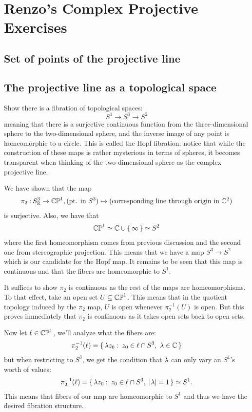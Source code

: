 \documentclass[12pt]{memoir}
\begin{document}
\chapter{Renzo's Complex Projective Exercises}

\section{Set of points of the projective line}

\section{The projective line as a topological space}

\begin{Ej}
    Show there is a fibration of topological spaces:
    $$S^1\to S^3\to S^2$$
    meaning that there is a surjective continuous function from the three-dimensional sphere to the two-dimensional sphere, and the inverse image of any point is homeomorphic to a circle. This is called the Hopf fibration; notice that while the construction of these maps is rather mysterious in terms of spheres, it becomes transparent when thinking of the two-dimensional sphere as the complex projective line.
\end{Ej}
\begin{ptcbr}
We have shown that the map 
$$\pi_2\mathbin{:} S^3_{\mathbb{R}}\to\mathbb{CP}^1,(\text{pt. in }S^3)\mapsto(\text{corresponding line through origin in }\mathbb{C}^2)$$
is surjective. Also, we have that 
$$\mathbb{CP}^1\simeq \mathbb{C}\cup\{\,\infty\,\}\simeq S^2$$
where the first homeomorphism comes from previous discussion and the second one from stereographic projection. This means that we have a map $S^3\to S^2$ which is our candidate for the Hopf map. It remains to be seen that this map is continuous and that the fibers are homeomorphic to $S^1$.\par 
It suffices to show $\pi_2$ is continuous as the rest of the maps are homeomorphisms. To that effect, take an open set $U\subseteq\mathbb{CP}^1$. This means that in the quotient topology induced by the $\pi_2$ map, $U$ is open whenever $\pi_2^{-1}(U)$ is open. But this proves immediately that $\pi_2$ is continuous as it takes open sets back to open sets.\par 
Now let $\ell\in\mathbb{CP}^1$, we'll analyze what the fibers are:
$$\pi_2^{-1}(\l)=\set{\la z_0\:\ z_0\in\l\cap S^3,\ \la\in\bC}$$
but when restricting to $S^3$, we get the condition that $\lambda$ can only vary an $S^1$'s worth of values:
$$\pi_2^{-1}(\ell)=\{\,\lambda z_0\mathbin{:}\ z_0\in\ell\cap S^3,\ |\lambda|=1\,\}\simeq S^1.$$
This means that fibers of our map are homeomorphic to $S^1$ and thus we have the desired fibration structure.
\end{ptcbr}
\ifx\nextra\undefined
\printindex
\else\fi
\nocite{*}


\end{document}
